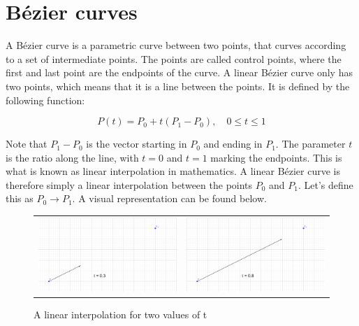\newcommand{\timeconstraint}{, \quad 0 \le t \le 1}
\newcommand{\lerp}{\rightarrow}
\newcommand{\p}[1]{P\textsubscript{#1}}

\section{Bézier curves}
    A Bézier curve is a parametric curve between two points, that curves according to a set of intermediate points. The points are called control points, where the first and last point are the endpoints of the curve. A linear Bézier curve only has two points, which means that it is a line between the points. It is defined by the following function:

    $$
        P(t) = P_0 + t(P_1 - P_0) \timeconstraint
    $$

    Note that $P_1 - P_0$ is the vector starting in $P_0$ and ending in $P_1$. The parameter $t$ is the ratio along the line, with $t = 0$ and $t = 1$ marking the endpoints. This is what is known as linear interpolation in mathematics. A linear Bézier curve is therefore simply a linear interpolation between the points $P_0$ and $P_1$. Let's define this as $P_0 \lerp P_1$. A visual representation can be found below.

    \begin{figure}[H]
        \begin{tabular}{cc}
            \includegraphics[width=0.48\linewidth]{figures/theory/bezier_curves/linear_interpolation1.png} & 
            \includegraphics[width=0.48\linewidth]{figures/theory/bezier_curves/linear_interpolation2.png} \\
        \end{tabular}
        \caption{A linear interpolation for two values of t}
    \end{figure}
    
